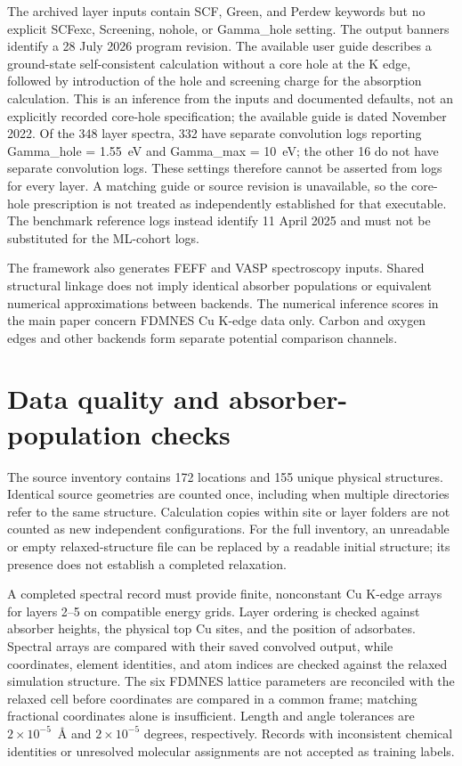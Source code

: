 \documentclass[11pt,a4paper]{article}
\begin{document}
The archived layer inputs contain SCF, Green, and Perdew keywords but no explicit SCFexc, Screening, nohole, or Gamma\_hole setting. The output banners identify a 28 July 2026 program revision. The available user guide describes a ground-state self-consistent calculation without a core hole at the K edge, followed by introduction of the hole and screening charge for the absorption calculation.\cite{fdmnesmanual} This is an inference from the inputs and documented defaults, not an explicitly recorded core-hole specification; the available guide is dated November 2022. Of the 348 layer spectra, 332 have separate convolution logs reporting Gamma\_hole = 1.55~eV and Gamma\_max = 10~eV; the other 16 do not have separate convolution logs. These settings therefore cannot be asserted from logs for every layer. A matching guide or source revision is unavailable, so the core-hole prescription is not treated as independently established for that executable. The benchmark reference logs instead identify 11 April 2025 and must not be substituted for the ML-cohort logs.

The framework also generates FEFF and VASP spectroscopy inputs.\cite{rehr2010,vaspxas} Shared structural linkage does not imply identical absorber populations or equivalent numerical approximations between backends. The numerical inference scores in the main paper concern FDMNES Cu K-edge data only. Carbon and oxygen edges and other backends form separate potential comparison channels.

\section{Data quality and absorber-population checks}
The source inventory contains 172 locations and 155 unique physical structures. Identical source geometries are counted once, including when multiple directories refer to the same structure. Calculation copies within site or layer folders are not counted as new independent configurations. For the full inventory, an unreadable or empty relaxed-structure file can be replaced by a readable initial structure; its presence does not establish a completed relaxation.

A completed spectral record must provide finite, nonconstant Cu K-edge arrays for layers 2--5 on compatible energy grids. Layer ordering is checked against absorber heights, the physical top Cu sites, and the position of adsorbates. Spectral arrays are compared with their saved convolved output, while coordinates, element identities, and atom indices are checked against the relaxed simulation structure. The six FDMNES lattice parameters are reconciled with the relaxed cell before coordinates are compared in a common frame; matching fractional coordinates alone is insufficient. Length and angle tolerances are $2\times10^{-5}$~\AA{} and $2\times10^{-5}$ degrees, respectively. Records with inconsistent chemical identities or unresolved molecular assignments are not accepted as training labels.
\end{document}

